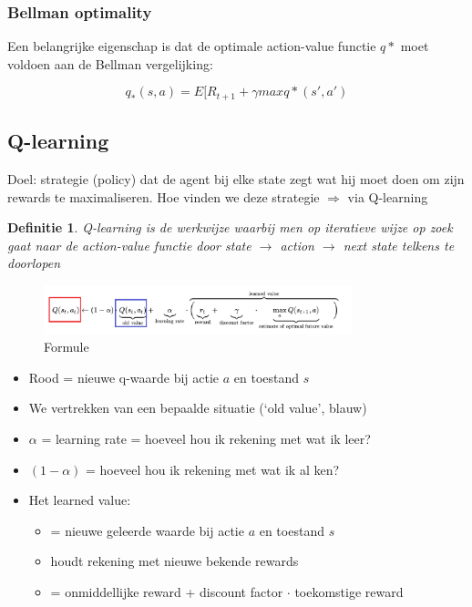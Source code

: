\documentclass{article}
\newtheorem{theorem}{Definitie}[section]
\begin{document}
\subsubsection{Bellman optimality}

Een belangrijke eigenschap is dat de optimale action-value functie $q*$
moet voldoen aan de Bellman vergelijking:

\begin{equation}
    q_* (s,a) = E \Big[ R_{t+1} + \gamma max q* (s', a')
\end{equation}

\subsection{Q-learning}

Doel: strategie (policy) dat de agent bij elke state zegt wat hij moet doen om zijn
rewards te maximaliseren. Hoe vinden we deze strategie $\Rightarrow$ via Q-learning

\begin{theorem}
    Q-learning is de werkwijze waarbij men op iteratieve wijze op zoek gaat naar
    de action-value functie door state $\rightarrow$ action $\rightarrow$ next state
    telkens te doorlopen
\end{theorem}

\begin{figure}[H]
    \centering
    \includegraphics[width=0.8\textwidth]{q-learning.png}
    \caption{Formule}
\end{figure}

\begin{itemize}
    \item Rood = nieuwe q-waarde bij actie $a$ en toestand $s$
    \item We vertrekken van een bepaalde situatie (`old value', blauw)
    \item $\alpha$ = learning rate = hoeveel hou ik rekening met wat ik leer?
    \item $(1-\alpha)$ = hoeveel hou ik rekening met wat ik al ken?
    \item Het learned value:
    \begin{itemize}
        \item = nieuwe geleerde waarde bij actie $a$ en toestand $s$
        \item houdt rekening met nieuwe bekende rewards
        \item = onmiddellijke reward + discount factor $\cdot$ toekomstige reward 
    \end{itemize}
\end{itemize}
\end{document}
